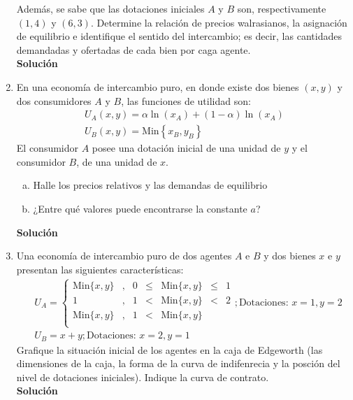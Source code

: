 \documentclass[10pt,a4paper]{article}
\begin{document}
\begin{enumerate}
		  Además, se sabe que las dotaciones iniciales  $A$ y $B$ son, respectivamente $(1, 4)$ y $(6, 3)$. Determine la relación de precios walrasianos, la asignación de equilibrio e identifique el sentido del intercambio; es decir, las cantidades demandadas y ofertadas de cada bien por caga agente.\\[0.5cm]
		  	\textbf{\LARGE Solución}\\
		  		
	\item En una economía de intercambio puro, en donde existe dos bienes $(x, y)$ y dos consumidores $A$ y $B$, las funciones de utilidad son:
				\begin{gather*}
					U_A (x,y) = \alpha \ln(x_A) + (1-\alpha)\ln(x_A)\\
					U_B (x,y) = \text{Min} \left\lbrace x_B, y_B\right\rbrace 
				\end{gather*}
			El consumidor $A$ posee una dotación inicial de una unidad de $y$ y el consumidor $B$, de una unidad de $x$.
				\begin{enumerate}[a)]
					\item Halle los precios relativos y las demandas de equilibrio
					\item ¿Entre qué valores puede encontrarse la constante $a$?
				\end{enumerate}
						\vspace{0.5cm}
					\textbf{\LARGE Solución}\\
						
	\item Una economía de intercambio puro de dos agentes $A$ e $B$ y dos bienes $x$ e $y$ presentan las siguientes características:
				\begin{align*}
					& U_A = \left\lbrace 
								\begin{array}{ccccccc}
									\text{Min}\{x,y\} & , & 0 & \leq & \text{Min}\{x,y\} & \leq & 1 \\
											1         & , & 1 &  <   & \text{Min}\{x,y\} &   <  & 2 \\
									\text{Min}\{x,y\} & , & 1 &  <   & \text{Min}\{x,y\} &   {} & {}\\
								\end{array}
							\right. ; \text{Dotaciones: } x = 1 , y = 2\\[0.3cm]
					& U_B = x + y ;\text{Dotaciones: } x = 2 , y = 1 
				\end{align*}
			Grafique la situación inicial de los agentes en la caja de Edgeworth (las dimensiones de la caja, la forma de la curva de indifenrecia y la posción del nivel de dotaciones iniciales). Indique la curva de contrato.\\[0.5cm]
				\textbf{\LARGE Solución}\\
					
\end{enumerate}

\end{document}
